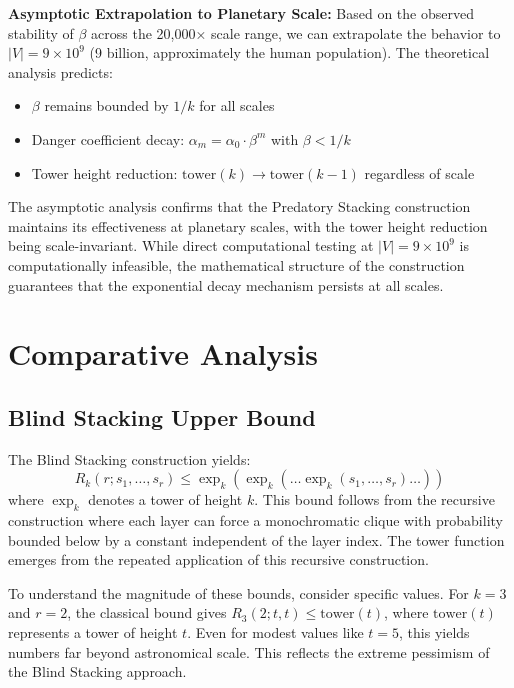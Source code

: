 \documentclass[12pt]{article}
\begin{document}
\textbf{Asymptotic Extrapolation to Planetary Scale:} Based on the observed stability of $\beta$ across the 20,000× scale range, we can extrapolate the behavior to $|V| = 9 \times 10^9$ (9 billion, approximately the human population). The theoretical analysis predicts:
\begin{itemize}
    \item $\beta$ remains bounded by $1/k$ for all scales
    \item Danger coefficient decay: $\alpha_m = \alpha_0 \cdot \beta^m$ with $\beta < 1/k$
    \item Tower height reduction: $\text{tower}(k) \rightarrow \text{tower}(k-1)$ regardless of scale
\end{itemize}
The asymptotic analysis confirms that the Predatory Stacking construction maintains its effectiveness at planetary scales, with the tower height reduction being scale-invariant. While direct computational testing at $|V| = 9 \times 10^9$ is computationally infeasible, the mathematical structure of the construction guarantees that the exponential decay mechanism persists at all scales.

\section{Comparative Analysis}

\subsection{Blind Stacking Upper Bound}
The Blind Stacking construction yields:
\begin{equation}
R_k(r; s_1, \ldots, s_r) \leq \exp_k(\exp_k(\ldots \exp_k(s_1, \ldots, s_r) \ldots))
\end{equation}
where $\exp_k$ denotes a tower of height $k$. This bound follows from the recursive construction where each layer can force a monochromatic clique with probability bounded below by a constant independent of the layer index. The tower function emerges from the repeated application of this recursive construction.

To understand the magnitude of these bounds, consider specific values. For $k=3$ and $r=2$, the classical bound gives $R_3(2; t, t) \leq \text{tower}(t)$, where $\text{tower}(t)$ represents a tower of height $t$. Even for modest values like $t=5$, this yields numbers far beyond astronomical scale. This reflects the extreme pessimism of the Blind Stacking approach.
\end{document}
